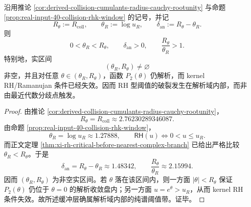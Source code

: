 \begin{corollary}[RH 临界与最近解析分歧之间存在严格缓冲层]\label{cor:derived-collision-rh-analytic-buffer-layer}
沿用推论 \ref{cor:derived-collision-cumulants-radius-cauchy-rootunity} 与命题 \ref{prop:real-input-40-collision-rhk-window} 的记号，并记
\[
R_\theta:=R_{\mathrm{coll}},
\qquad
\theta_R:=\log u_R,
\qquad
\delta_{\mathrm{an}}:=R_\theta-\theta_R.
\]
则
\[
0<\theta_R<R_\theta,
\qquad
\delta_{\mathrm{an}}>0,
\qquad
\frac{R_\theta}{\theta_R}>1.
\]
特别地，实区间
\[
(\theta_R,R_\theta)\neq \varnothing
\]
非空，并且对任意 \(\theta\in(\theta_R,R_\theta)\)，函数 \(P_2(\theta)\) 仍解析，而 kernel RH/Ramanujan 条件已经失效。因而 RH 型阈值的破裂发生在解析域内部，而非由最近代数分歧点触发。
\end{corollary}
\begin{proof}
由推论 \ref{cor:derived-collision-cumulants-radius-cauchy-rootunity}，
\[
R_\theta=R_{\mathrm{coll}}\approx 2.76230289346087.
\]
由命题 \ref{prop:real-input-40-collision-rhk-window}，
\[
\theta_R=\log u_R\approx 1.27888,
\qquad
\textsf{RH}(u)\iff 0<u\le u_R.
\]
而正文定理 \ref{thm:xi-rh-critical-before-nearest-complex-branch} 已给出严格比较 \(\theta_R<R_\theta\)。于是
\[
\delta_{\mathrm{an}}=R_\theta-\theta_R\approx 1.48342,
\qquad
\frac{R_\theta}{\theta_R}\approx 2.15994.
\]
因而 \((\theta_R,R_\theta)\) 为非空实区间。若 \(\theta\) 落在该区间内，则一方面 \(|\theta|<R_\theta\) 保证 \(P_2(\theta)\) 仍位于 \(\theta=0\) 的解析收敛盘内；另一方面 \(u=e^\theta>u_R\)，从而 kernel RH 条件失效。故所述缓冲层确属解析域内部的纯谱阈值带。证毕。
\end{proof}

